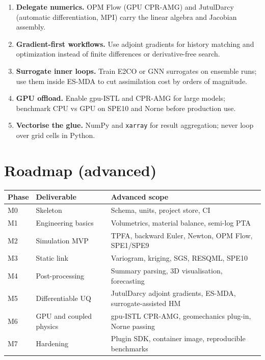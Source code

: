 \documentclass[10pt,a4paper]{article}
\begin{document}
\begin{enumerate}[leftmargin=1.4em]
  \item \textbf{Delegate numerics.} OPM Flow (GPU CPR-AMG) and JutulDarcy
        (automatic differentiation, MPI) carry the linear algebra and Jacobian
        assembly.
  \item \textbf{Gradient-first workflows.} Use adjoint gradients for history
        matching and optimization instead of finite differences or
        derivative-free search.
  \item \textbf{Surrogate inner loops.} Train E2CO or GNN surrogates on
        ensemble runs; use them inside ES-MDA to cut assimilation cost by
        orders of magnitude.
  \item \textbf{GPU offload.} Enable gpu-ISTL and CPR-AMG for large models;
        benchmark CPU vs GPU on SPE10 and Norne before production use.
  \item \textbf{Vectorise the glue.} NumPy and \texttt{xarray} for result
        aggregation; never loop over grid cells in Python.
\end{enumerate}

\section{Roadmap (advanced)}

\begin{longtable}{@{}p{1.4cm}p{4.6cm}p{8.2cm}@{}}
\toprule
\textbf{Phase} & \textbf{Deliverable} & \textbf{Advanced scope}\\
\midrule
M0 & Skeleton & Schema, units, project store, CI\\
M1 & Engineering basics & Volumetrics, material balance, semi-log PTA\\
M2 & Simulation MVP & TPFA, backward Euler, Newton, OPM Flow, SPE1/SPE9\\
M3 & Static link & Variogram, kriging, SGS, RESQML, SPE10\\
M4 & Post-processing & Summary parsing, 3D visualisation, forecasting\\
M5 & Differentiable UQ & JutulDarcy adjoint gradients, ES-MDA, surrogate-assisted HM\\
M6 & GPU and coupled physics & gpu-ISTL CPR-AMG, geomechanics plug-in, Norne passing\\
M7 & Hardening & Plugin SDK, container image, reproducible benchmarks\\
\bottomrule
\end{longtable}
\end{document}
